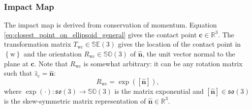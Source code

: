 \documentclass[]{article}
\newcommand{\colvec}[1]{\mathbf{#1}}
\newcommand{\cframe}[1]{\left\{\mathrm{#1}\right\}}
\theoremstyle{definition}
\theoremstyle{remark}
\begin{document}
\subsubsection{Impact Map}
The impact map is derived from conservation of momentum.
Equation \eqref{eq:closest_point_on_ellipsoid_general} gives the contact point $\colvec{c}\in\mathbb{R}^3$.
The transformation matrix $T_\mathrm{wc}\in\mathbb{SE}(3)$ gives the location of the contact point in $\cframe{w}$ and the orientation $R_\mathrm{wc}\in\mathbb{SO}(3)$ of $\hat{\colvec{n}}$, the unit vector normal to the plane at $\colvec{c}$.
Note that $R_\mathrm{wc}$ is somewhat arbitrary: it can be any rotation matrix such that $\hat{z}_\mathrm{c} = \hat{\colvec{n}}$:
\begin{equation*}
	R_\mathrm{wc} = \exp\left(\left[\hat{\colvec{n}}\right]\right),
\end{equation*}
where $\exp\left(\cdot\right): \mathfrak{so}(3)\to\mathbb{SO}(3)$ is the matrix exponential and $\left[\hat{\colvec{n}}\right]\in\mathfrak{so}(3)$ is the skew-symmetric matrix representation of $\hat{\colvec{n}}\in\mathbb{R}^3$.
\end{document}

